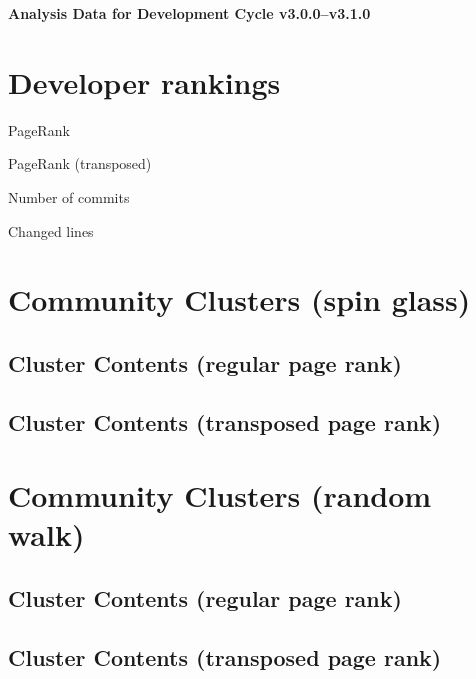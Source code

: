 \documentclass{article}
\begin{document}
\setlength{\parindent}{0pt}
\begin{center}
\begin{Large}
\textbf{Analysis Data for Development Cycle v3.0.0--v3.1.0}
\end{Large}
\end{center}
\section{Developer rankings}
\begin{small}\renewcommand{\tabcolsep}{1pt}
\begin{minipage}{0.5\linewidth}
PageRank\\

\end{minipage}%
\begin{minipage}{0.5\linewidth}
PageRank (transposed)\\

\end{minipage}

\renewcommand{\tabcolsep}{5pt}
\begin{minipage}{0.5\linewidth}
Number of commits\\

\end{minipage}%
\begin{minipage}{0.5\linewidth}
Changed lines\\

\end{minipage}
\end{small}
\newpage\section{Community Clusters (spin glass)}
\subsection{Cluster Contents (regular page rank)}
\newpage\subsection{Cluster Contents (transposed page rank)}
\newpage\section{Community Clusters (random walk)}
\subsection{Cluster Contents (regular page rank)}
\newpage\subsection{Cluster Contents (transposed page rank)}
\end{document}

